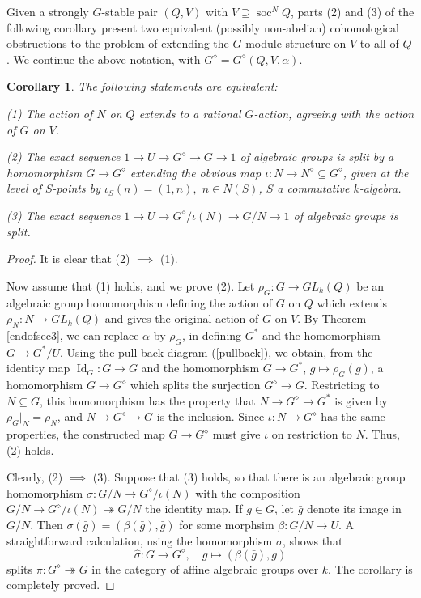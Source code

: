 \documentclass[11pt,leqno,amscd,amssymb,verbatim, url]{amsart}
\newtheorem{cor}[thm]{Corollary}
\theoremstyle{definition}
\numberwithin{equation}{thm}
\newcommand{\id}{\operatorname{Id}}
\newcommand{\soc}{\operatorname{soc}}
\begin{document}
Given a strongly $G$-stable pair $(Q,V)$ with $V\supseteq\soc^NQ$, parts (2) and (3) of the following corollary present two equivalent (possibly non-abelian) cohomological obstructions to the problem
of extending the $G$-module structure on $V$ to all of $Q$. We continue the above notation, with
$G^\diamond=G^\diamond(Q,V,\alpha)$.

\begin{cor}\label{cortoendofsec3}The following statements are equivalent:

(1) The action of $N$ on $Q$ extends to a rational $G$-action,
agreeing with the action of $G$
on $V$.

(2) The exact sequence $1\to U\to G^\diamond\to G\to 1$ of algebraic groups
is split by a homomorphism $G\to G^\diamond$
extending the obvious map $\iota:N\to N^\diamond\subseteq G^\diamond$,
given at the level of $S$-points by
$\iota_S(n)=(1,n),$ $n\in N(S)$, $S$ a commutative $k$-algebra.

(3) The exact sequence
$1\to U\to G^\diamond/\iota(N)\to G/N\to 1$
of algebraic groups is split.
\end{cor}
\begin{proof}It is clear that (2) $\implies$ (1). 

Now assume that (1) holds, and we prove (2).  Let $\rho_G:G\to GL_k(Q)$ be an algebraic group homomorphism
defining the action of $G$ on $Q$ which extends $\rho_N:N\to GL_k(Q)$ and gives the 
original action of $G$ on $V$.  By Theorem \ref{endofsec3}, we can replace
$\alpha$ by $\rho_G$, in defining $G^*$ and the homomorphism $G\to G^*/U$. Using the pull-back diagram (\ref{pullback}), we obtain, from the identity
map $\id_G:G\to G$ and the homomorphism $G\to G^*$, $g\mapsto \rho_G(g)$, a homomorphism $G\to G^\diamond$ which splits the surjection $G^\diamond\to G$.   Restricting to $N\subseteq G$, this
homomorphism has the property that $N\to G^\diamond\to G^*$ is given by $\rho_G|_N=\rho_N$, and $N\to G^\diamond\to G$ is the inclusion.
Since $\iota:N\to G^\diamond$ has the same properties, the constructed map $G\to G^\diamond$ must give $\iota$ on restriction
to $N$. Thus, (2) holds.

Clearly, (2) $\implies$ (3). Suppose that (3) holds, so that there is an algebraic group homomorphism $\sigma:G/N\to G^\diamond/\iota(N)$ with the composition $G/N\to G^\diamond/\iota(N)\twoheadrightarrow G/N$ the identity map.  If $g\in G$, let $\bar g$ denote its image in $G/N$. Then $\sigma(\bar g)=
(\beta(\bar g),\bar g)$ for some morphsim $\beta:G/N\to U$. A straightforward calculation, using the
homomorphism $\sigma$, shows
that 
$$\widehat\sigma:G\to G^\diamond,\quad g\mapsto (\beta(\bar g),g)$$
splits $\pi:G^\diamond\twoheadrightarrow G$ in the category of affine algebraic groups over $k$. The corollary is completely proved.\end{proof}
\end{document}

